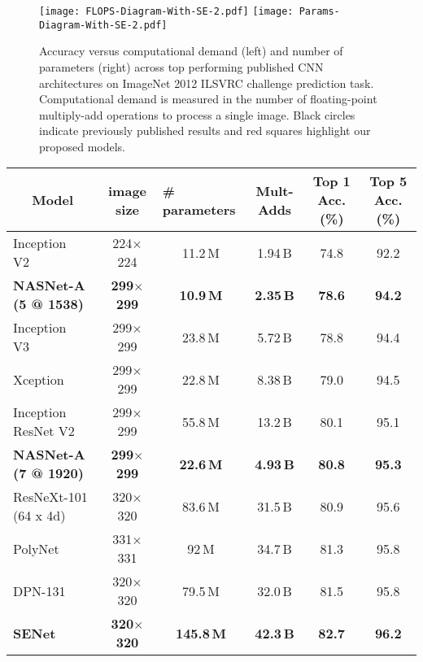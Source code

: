 \documentclass[10pt,twocolumn,letterpaper]{article}
\begin{document}
\begin{figure*}[h!]
\begin{center}
\texttt{[image: FLOPS-Diagram-With-SE-2.pdf]}
\hfill
\texttt{[image: Params-Diagram-With-SE-2.pdf]}
\caption{Accuracy versus computational demand (left) and number of parameters (right) across top performing published CNN architectures on ImageNet 2012 ILSVRC challenge prediction task. Computational demand is measured in the number of floating-point multiply-add operations to process a single image. Black circles indicate previously published results and red squares highlight our proposed models.}
\label{figure:flops_vs_accuracy}
\end{center}
\end{figure*}\begin{table*}[h!]
\centering
\small
\begin{tabular}{lc|cc|cc}
\toprule
\multicolumn{1}{c}{\bf Model} & {\bf image size} & \multicolumn{1}{l}{\bf \# parameters} & \bf Mult-Adds & \bf Top 1 Acc. (\%) & \bf Top 5 Acc. (\%) \\ \midrule
Inception V2~\cite{BatchNorm} & 224$\times$224 & 11.2\,M & 1.94\,B & 74.8 & 92.2 \\
\textbf{NASNet-A (5 @ 1538)} & \textbf{299$\times$299} & \textbf{10.9\,M} & \textbf{2.35\,B} & \textbf{78.6} & \textbf{94.2} \\
\midrule
Inception V3~\cite{szegedy2016rethinking} & 299$\times$299 & 23.8\,M & 5.72\,B & 78.8 & 94.4 \\
Xception~\cite{chollet2016xception}& 299$\times$299 & 22.8\,M & 8.38\,B & 79.0 & 94.5 \\
Inception ResNet V2~\cite{szegedy2016inception} & 299$\times$299 & 55.8\,M & 13.2\,B & 80.1 & 95.1 \\
\textbf{NASNet-A (7 @ 1920)} & \textbf{299$\times$299} & \textbf{22.6\,M} & \textbf{4.93\,B} & \textbf{80.8} & \textbf{95.3} \\
\midrule
ResNeXt-101 (64 x 4d)~\cite{xie2016aggregated} & 320$\times$320 & 83.6\,M & 31.5\,B & 80.9 & 95.6 \\
PolyNet~\cite{zhang2016polynet} & 331$\times$331 & 92\,M & 34.7\,B & 81.3 & 95.8 \\
DPN-131~\cite{dualpath} & 320$\times$320 & 79.5\,M & 32.0\,B & 81.5 & 95.8 \\
{\bf SENet~\cite{hu2017squeeze}}& {\bf 320$\times$320} & {\bf 145.8\,M} & {\bf 42.3\,B} & {\bf 82.7} & {\bf 96.2} \\


\end{tabular}
\end{table*}
\end{document}

